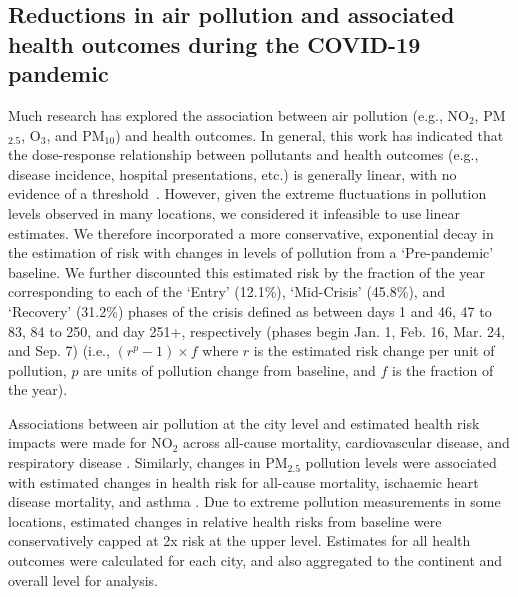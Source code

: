 \documentclass[preprint,10pt]{elsarticle} %
\begin{document}
\subsection*{Reductions in air pollution and associated health outcomes during the COVID-19 pandemic}
Much research has explored the association between air pollution (e.g., NO$_{2}$, PM$_{2.5}$, O$_{3}$, and PM$_{10}$) and health outcomes. In general, this work has indicated that the dose-response relationship between pollutants and health outcomes (e.g., disease incidence, hospital presentations, etc.) is generally linear, with no evidence of a threshold~\cite{schwartz2002concentration}. However, given the extreme fluctuations in pollution levels observed in many locations, we considered it infeasible to use linear estimates. We therefore incorporated a more conservative, exponential decay in the estimation of risk with changes in levels of pollution from a `Pre-pandemic' baseline. We further discounted this estimated risk by the fraction of the year corresponding to each of the `Entry' (12.1\%), `Mid-Crisis' (45.8\%), and `Recovery' (31.2\%) phases of the crisis defined as between days 1 and 46, 47 to 83, 84 to 250, and day 251+, respectively (phases begin Jan. 1, Feb. 16, Mar. 24, and Sep. 7) (i.e., $(r^{p}-1) \times f$ where $r$ is the estimated risk change per unit of pollution, $p$ are units of pollution change from baseline, and $f$ is the fraction of the year). 

Associations between air pollution at the city level and estimated health risk impacts were made for NO$_{2}$ across all-cause mortality, cardiovascular disease, and respiratory disease \cite{Huang19Pollution}. Similarly, changes in PM$_{2.5}$ pollution levels were associated with estimated changes in health risk for all-cause mortality, ischaemic heart disease mortality, and asthma \cite{Xie257, Yu2020PM2.5, BALTI2014161}. Due to extreme pollution measurements in some locations, estimated changes in relative health risks from baseline were conservatively capped at 2x risk at the upper level. Estimates for all health outcomes were calculated for each city, and also aggregated to the continent and overall level for analysis. 
\end{document}

